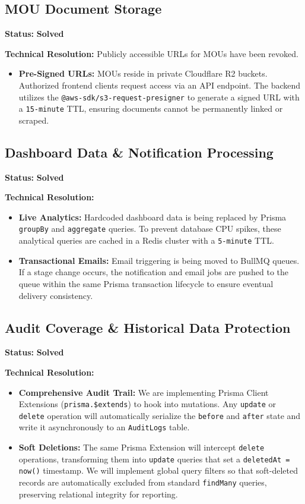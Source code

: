 \documentclass[12pt, a4paper]{article}
\begin{document}
\subsection{MOU Document Storage}
\textbf{Status:} \textcolor{solved}{\textbf{Solved}}

\textbf{Technical Resolution:}
Publicly accessible URLs for MOUs have been revoked.
\begin{itemize}
    \item \textbf{Pre-Signed URLs:} MOUs reside in private Cloudflare R2 buckets. Authorized frontend clients request access via an API endpoint. The backend utilizes the \texttt{@aws-sdk/s3-request-presigner} to generate a signed URL with a \texttt{15-minute} TTL, ensuring documents cannot be permanently linked or scraped.
\end{itemize}

\subsection{Dashboard Data \& Notification Processing}
\textbf{Status:} \textcolor{solved}{\textbf{Solved}}

\textbf{Technical Resolution:}
\begin{itemize}
    \item \textbf{Live Analytics:} Hardcoded dashboard data is being replaced by Prisma \texttt{groupBy} and \texttt{aggregate} queries. To prevent database CPU spikes, these analytical queries are cached in a Redis cluster with a \texttt{5-minute} TTL.
    \item \textbf{Transactional Emails:} Email triggering is being moved to BullMQ queues. If a stage change occurs, the notification and email jobs are pushed to the queue within the same Prisma transaction lifecycle to ensure eventual delivery consistency.
\end{itemize}

\subsection{Audit Coverage \& Historical Data Protection}
\textbf{Status:} \textcolor{solved}{\textbf{Solved}}

\textbf{Technical Resolution:}
\begin{itemize}
    \item \textbf{Comprehensive Audit Trail:} We are implementing Prisma Client Extensions (\texttt{prisma.\$extends}) to hook into mutations. Any \texttt{update} or \texttt{delete} operation will automatically serialize the \texttt{before} and \texttt{after} state and write it asynchronously to an \texttt{AuditLogs} table.
    \item \textbf{Soft Deletions:} The same Prisma Extension will intercept \texttt{delete} operations, transforming them into \texttt{update} queries that set a \texttt{deletedAt = now()} timestamp. We will implement global query filters so that soft-deleted records are automatically excluded from standard \texttt{findMany} queries, preserving relational integrity for reporting.
\end{itemize}
\end{document}
